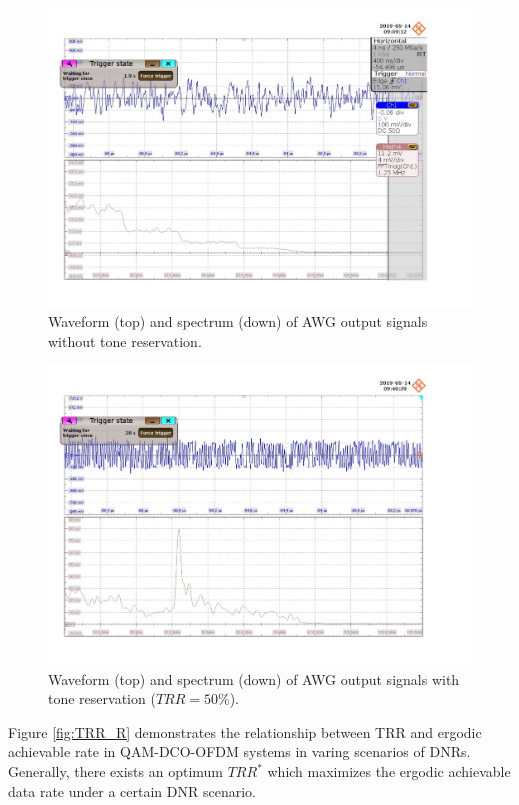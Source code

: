 \documentclass[9pt,twocolumn,twoside]{osajnl}
\begin{document}
\begin{figure}[t]
  \centering
  \includegraphics[width=\linewidth]{figures/250M_R0.pdf}
  \caption{Waveform (top) and spectrum (down) of AWG output signals without tone reservation.}
  \label{fig:R0}
\end{figure}

\begin{figure}[t]
  \centering
  \includegraphics[width=\linewidth]{figures/250M_R50.pdf}
  \caption{Waveform (top) and spectrum (down) of AWG output signals with tone reservation ($TRR=50\%$).}
  \label{fig:R50}
\end{figure}

Figure \ref{fig:TRR_R} demonstrates the relationship between TRR and ergodic achievable rate in QAM-DCO-OFDM systems in varing scenarios of DNRs. Generally, there exists an optimum $TRR^*$ which maximizes the ergodic achievable data rate under a certain DNR scenario.
\end{document}
